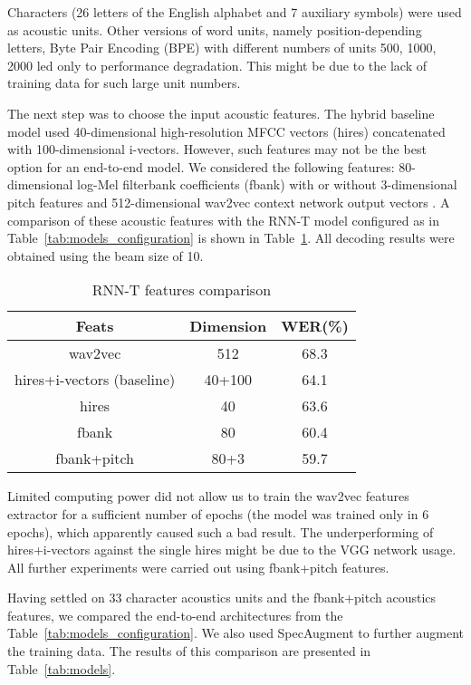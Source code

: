 \documentclass[a4paper]{article}
\begin{document}
Characters (26 letters of the English alphabet and 7 auxiliary symbols) were used as acoustic units. Other versions of word units, namely position-depending letters, Byte Pair Encoding (BPE) \cite{sennrich2015neural} with different numbers of units 500, 1000, 2000 led only to performance degradation. This might be due to the lack of training data for such large unit numbers.

The next step was to choose the input acoustic features. The hybrid baseline model used 40-dimensional high-resolution MFCC vectors (hires) concatenated with 100-dimensional i-vectors. However, such features may not be the best option for an end-to-end model. We considered the following features: 80-dimensional log-Mel filterbank coefficients (fbank) with or without 3-dimensional pitch features and 512-dimensional wav2vec context network output vectors \cite{schneider_wav2vec:_2019}. A comparison of these acoustic features with the RNN-T model configured as in Table~\ref{tab:models_configuration} is shown in Table~\ref{tab:feats}. All decoding results were obtained using the beam size of 10.

\begin{table}[ht]
  \caption{RNN-T features comparison}
  \label{tab:feats}
  \centering
  \begin{tabular}{c c c}
    \toprule
    \textbf{Feats} & \textbf{Dimension} & \textbf{WER(\%)} \\
    \midrule
    wav2vec & 512 & 68.3 \\
    \midrule
    hires+i-vectors (baseline)  & 40+100 & 64.1 \\
    \midrule
    hires & 40 & 63.6 \\
    \midrule
    fbank & 80 & 60.4 \\
    \midrule
    fbank+pitch & 80+3 & 59.7 \\
    \bottomrule
  \end{tabular}
\end{table}

Limited computing power did not allow us to train the wav2vec features extractor for a sufficient number of epochs (the model was trained only in 6 epochs), which apparently caused such a bad result. The underperforming of hires+i-vectors against the single hires might be due to the VGG network usage. All further experiments were carried out using fbank+pitch features.

Having settled on 33 character acoustics units and the fbank+pitch acoustics features, we compared the end-to-end architectures from the Table~\ref{tab:models_configuration}. We also used SpecAugment \cite{Park_2019} to further augment the training data. The results of this comparison are presented in Table~\ref{tab:models}.
\end{document}

